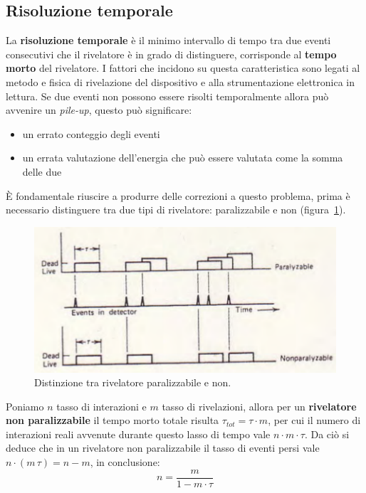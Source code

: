 \subsection{Risoluzione temporale}
La \textbf{risoluzione temporale} \`e il minimo intervallo di tempo tra due eventi consecutivi che il rivelatore \`e in grado di distinguere,
corrisponde al \textbf{tempo morto} del rivelatore.
I fattori che incidono su questa caratteristica sono legati al metodo e fisica di rivelazione del dispositivo e alla strumentazione elettronica in lettura.
Se due eventi non possono essere risolti temporalmente allora pu\`o avvenire un \textit{pile-up}, questo pu\`o significare:
\begin{itemize}
\item un errato conteggio degli eventi
\item un errata valutazione dell'energia che pu\`o essere valutata come la somma delle due
\end{itemize}
\`E fondamentale riuscire a produrre delle correzioni a questo problema, prima \`e necessario distinguere tra due tipi di rivelatore: paralizzabile e non (figura~\ref{fig:tempoMorto}).
\begin{figure}[htbp]
\begin{center}
\includegraphics[scale=0.90]{./Immagini/TempoMorto.png}
\caption{Distinzione tra rivelatore paralizzabile e non.}
\label{fig:tempoMorto}
\end{center}
\end{figure}
Poniamo $n$ tasso di interazioni e $m$ tasso di rivelazioni, allora per un \textbf{rivelatore non paralizzabile} il tempo morto totale risulta
$\tau_{tot} = \tau \cdot m$, per cui il numero di interazioni reali avvenute durante questo lasso di tempo vale $n\cdot m \cdot \tau$.
Da ci\`o si deduce che in un rivelatore non paralizzabile il tasso di eventi persi vale $n \cdot (m\,\tau) = n - m$, in conclusione:
\begin{equation}\label{eq:rivnonpar}
n = \frac{m}{1-m\cdot \tau}
\end{equation}
